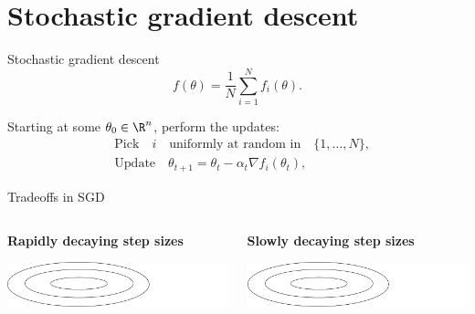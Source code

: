 \documentclass{beamer}
\begin{document}
\section{Stochastic gradient descent}

\begin{frame}[t]{Stochastic gradient descent}
	\grid
	$$
	f(\theta) = \frac{1}{N} \sum_{i=1}^N f_i(\theta).
	$$
	\vspace{-0.6cm}
	\begin{exampleblock}{}
		Starting at some $\theta_0 \in \R^n$, perform the updates:
\begin{align*}
	&\text{Pick} \quad i \quad \text{uniformly at random in} \quad \{1, \dots, N\}, \\
	&\text{Update} \quad \theta_{t+1} = \theta_t - \alpha_t \nabla f_i(\theta_t),
\end{align*}
	\end{exampleblock}

\end{frame}

\begin{frame}[t]{Tradeoffs in SGD}
	\grid

	\begin{columns}
		\begin{column}{0.45\textwidth}
			\vspace{-0.5cm}
			\begin{center}
				\textbf{Rapidly decaying step sizes}
			\end{center}
			\hspace*{-0.4cm}\includegraphics[width=9cm]{../figures/contour.pdf}
			\vspace{7cm}
	\end{column}
	\vrule
		\begin{column}{0.55\textwidth}
			\vspace{-0.5cm}
			\begin{center}
				\textbf{Slowly decaying step sizes}
			\end{center}
			\hspace*{0.4cm}\includegraphics[width=9cm]{../figures/contour.pdf}
			\vspace{7cm}
	\end{column}
	\end{columns}

\end{frame}
\end{document}
